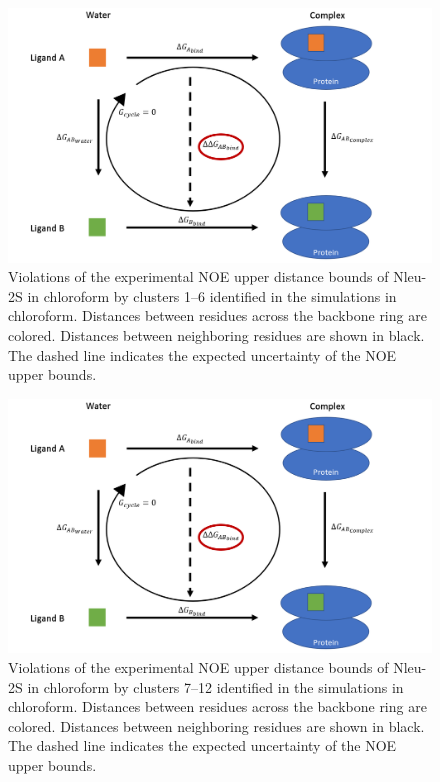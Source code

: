 \begin{figure}
    \centering
    \includegraphics[width=\textwidth]{fig/dummy.png}
    \caption{Violations  of  the  experimental  NOE  upper  distance  bounds  of  Nleu-2S  in chloroform by clusters 1–6 identified in the simulations in chloroform. Distances              between residues across the backbone ring are colored. Distances between neighboring residues are shown in black. The dashed line indicates the expected uncertainty of          the NOE upper bounds.}
    \label{fig: SINOE violations Nleu-2S}
\end{figure}

\begin{figure}
    \centering
    \includegraphics[width=\textwidth]{fig/dummy.png}
    \caption{Violations  of  the  experimental  NOE  upper  distance  bounds  of  Nleu-2S  in chloroform by clusters 7–12 identified in the simulations in chloroform. Distances             between residues across the backbone ring are colored. Distances between neighboring residues are shown in black. The dashed line indicates the expected uncertainty of          the NOE upper bounds.}
    \label{fig: SINOE violations Nleu-2SII}
\end{figure}

